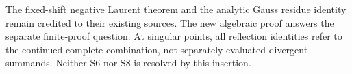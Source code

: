 The fixed-shift negative Laurent theorem and the analytic Gauss residue
identity remain credited to their existing sources. The new algebraic
proof answers the separate finite-proof question. At singular points,
all reflection identities refer to the continued complete combination,
not separately evaluated divergent summands. Neither S6 nor S8 is
resolved by this insertion.
